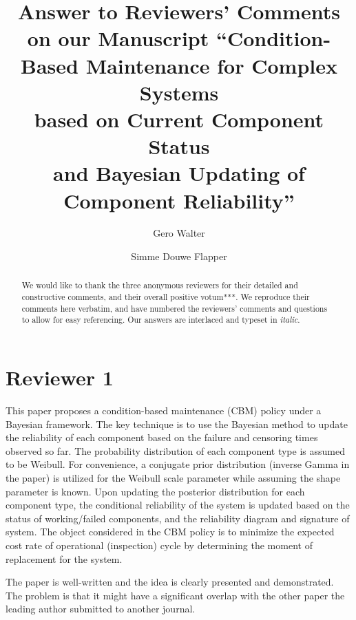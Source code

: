 \documentclass[authoryear]{elsarticle}
\begin{document}

\begin{frontmatter}
\title{Answer to Reviewers' Comments on our Manuscript
``Condition-Based Maintenance for Complex Systems\\ based on Current Component Status\\ and Bayesian Updating of Component Reliability''}

\author[tue]{Gero Walter}
\author[tue]{Simme Douwe Flapper}

\address[tue]{School of Industrial Engineering, Eindhoven University of Technology, Eindhoven, Netherlands}


\begin{abstract}
We would like to thank the three anonymous reviewers for their detailed and constructive comments,
and their overall positive votum***.
We reproduce their comments here verbatim,
and have numbered the reviewers' comments and questions to allow for easy referencing. 
Our answers are interlaced and typeset in \emph{italic}.
\end{abstract}
\end{frontmatter}


\section*{Reviewer 1}

This paper proposes a condition-based maintenance (CBM) policy under a Bayesian framework. The key technique is to use the Bayesian method to update the reliability of each component based on the failure and censoring times observed so far. The probability distribution of each component type is assumed to be Weibull. For convenience, a conjugate prior distribution (inverse Gamma in the paper) is utilized for the Weibull scale parameter while assuming the shape parameter is known. Upon updating the posterior distribution for each component type, the conditional reliability of the system is updated based on the status of working/failed components, and the reliability diagram and signature of system. The object considered in the CBM policy is to minimize the expected cost rate of operational (inspection) cycle by determining the moment of replacement for the system.

The paper is well-written and the idea is clearly presented and demonstrated.
The problem is that it might have a significant overlap with the other paper the leading author submitted to another journal.
\end{document}
